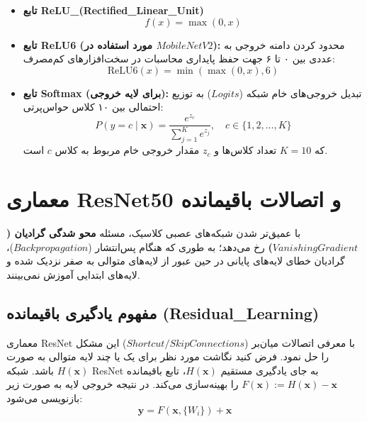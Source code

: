\documentclass{report}
\begin{document}
 	\begin{itemize}
 		\item \textbf{تابع ReLU\_(Rectified\_Linear\_Unit)}
 		\begin{equation}
 			f(x) = \max(0, x)
 		\end{equation}
 		\item \textbf{تابع ReLU6 (مورد استفاده در $MobileNetV2$):} محدود کردن دامنه خروجی به عددی بین ۰ تا ۶ جهت حفظ پایداری محاسبات در سخت‌افزارهای کم‌مصرف:
 		\begin{equation}
 			\text{ReLU6}(x) = \min(\max(0, x), 6)
 		\end{equation}
 		\item \textbf{تابع Softmax (برای لایه خروجی):} تبدیل خروجی‌های خام شبکه ($Logits$) به توزیع احتمالی بین ۱۰ کلاس حواس‌پرتی:
 		\begin{equation}
 			P(y = c \mid \mathbf{x}) = \frac{e^{z_c}}{\sum_{j=1}^{K} e^{z_j}}, \quad c \in \{1, 2, \dots, K\}
 		\end{equation}
 		که $K=10$ تعداد کلاس‌ها و $z_c$ مقدار خروجی خام مربوط به کلاس $c$ است.
 	\end{itemize}
 	
 	\section{معماری ResNet50 و اتصالات باقیمانده}
 	با عمیق‌تر شدن شبکه‌های عصبی کلاسیک، مسئله \textbf{محو شدگی گرادیان ($Vanishing Gradient$)} رخ می‌دهد؛ به طوری که هنگام پس‌انتشار ($Backpropagation$)، گرادیان خطای لایه‌های پایانی در حین عبور از لایه‌های متوالی به صفر نزدیک شده و لایه‌های ابتدایی آموزش نمی‌بینند.
 	
 	\subsection{مفهوم یادگیری باقیمانده (Residual\_Learning)}
 	معماری ResNet با معرفی اتصالات میان‌بر ($Shortcut/Skip Connections$) این مشکل را حل نمود. فرض کنید نگاشت مورد نظر برای یک یا چند لایه متوالی به صورت $H(\mathbf{x})$ باشد. شبکه ResNet به جای یادگیری مستقیم $H(\mathbf{x})$، تابع باقیمانده $F(\mathbf{x}) := H(\mathbf{x}) - \mathbf{x}$ را بهینه‌سازی می‌کند. در نتیجه خروجی لایه به صورت زیر بازنویسی می‌شود:
 	\begin{equation}
 		\mathbf{y} = F(\mathbf{x}, \{W_i\}) + \mathbf{x}
 	\end{equation}
 	
\end{document}
